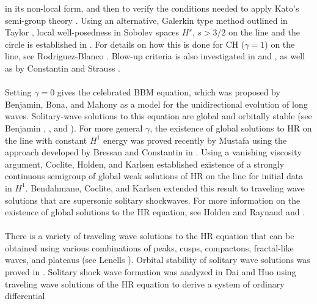 \documentclass[12pt,reqno]{amsart}
\numberwithin{equation}{section}  %
\numberwithin{figure}{section}
\begin{document}
in its non-local form, and then to verify the conditions needed to apply 
Kato's semi-group theory \cite{Kato_1975_Quasi-linear-eq}. Using an alternative,
Galerkin type method outlined in Taylor \cite{Taylor_1991_Pseudodifferent}, local
well-posedness in Sobolev spaces $H^s$,  $s > 3/2$ on the line and the circle is
established in \cite{Karapetyan:2010fk}. 
For details on how this is done for CH ($\gamma =1$) on the line, see Rodriguez-Blanco 
\cite{Rodriguez-Blanco_2001_On-the-Cauchy-p}. Blow-up criteria 
is also investigated in \cite{Yin_2003_On-the-Cauchy-p} and 
\cite{Zhou_2005_Local-well-pose}, as well as by Constantin and Strauss 
\cite{Constantin_2000_Stability-of-a-}. 
\\
\\
Setting $\gamma = 0$ gives the celebrated 
BBM equation, which was proposed by 
Benjamin, Bona, and Mahony 
\cite{Benjamin_1972_Model-equations} as a model for 
the unidirectional evolution of long waves.
Solitary-wave solutions to this 
equation are global and orbitally stable (see Benjamin 
\cite{Benjamin_1972_The-stability-o}, 
\cite{Benjamin_1972_Model-equations}, and 
\cite{Constantin_2000_Stability-of-a-}).
For more general $\gamma$, the existence of global 
solutions to HR on the line with constant $H^1$ energy
was proved recently by Mustafa \cite{Mustafa_2007_Global-conserva}
using the approach developed by Bressan and 
Constantin in \cite{Bressan_2007_Global-conserva}. Using a vanishing 
viscosity argument, Coclite, 
Holden, and Karlsen \cite{Coclite_2005_Global-weak-sol}
established existence of a strongly continuous semigroup of global 
weak solutions of HR on the line for initial data in $H^1$.
Bendahmane, Coclite, and Karlsen 
\cite{Bendahmane_2006_Hsp-1-perturbat} extended this result to traveling 
wave solutions that are supersonic solitary shockwaves.
For more information on the existence of global solutions to the HR
equation, see Holden and Raynaud \cite{Holden_2007_Global-conserva}
and \cite{Yin_2003_On-the-Cauchy-p}. 
\\
\\
There is a variety of traveling wave solutions to the HR equation that can be 
obtained using various combinations of peaks, cusps, compactons, 
fractal-like waves, and plateaus (see Lenells 
\cite{Lenells_2006_Traveling-waves}). Orbital stability of solitary wave 
solutions was proved in \cite{Constantin_2000_Stability-of-a-}.
Solitary shock wave formation was 
analyzed in Dai and Huo \cite{Dai_2000_Solitary-shock-} using traveling 
wave solutions of the HR equation to derive a system of ordinary differential 
\end{document}
